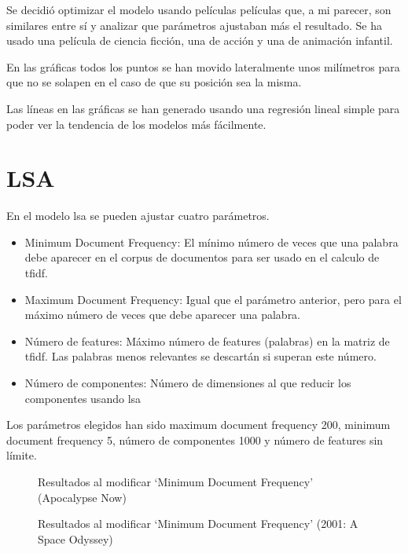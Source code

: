 \documentclass[withindex, glossary]{cam-thesis}
\begin{document}
Se decidió optimizar el modelo usando películas películas que, a mi parecer, son similares entre sí y analizar que parámetros ajustaban más el resultado. Se ha usado una película de ciencia ficción, una de acción y una de animación infantil.

En las gráficas todos los puntos se han movido lateralmente unos milímetros para que no se solapen en el caso de que su posición sea la misma.

Las líneas en las gráficas se han generado usando una regresión lineal simple para poder ver la tendencia de los modelos más fácilmente.

\section{LSA}
En el modelo \acrshort{lsa} se pueden ajustar cuatro parámetros.

\begin{itemize}
    \item Minimum Document Frequency: El mínimo número de veces que una palabra debe aparecer en el corpus de documentos para ser usado en el calculo de \acrshort{tfidf}.
    \item Maximum Document Frequency: Igual que el parámetro anterior, pero para el máximo número de veces que debe aparecer una palabra.
    \item Número de features: Máximo número de features (palabras) en la matriz de \acrshort{tfidf}. Las palabras menos relevantes se descartán si superan este número.
    \item Número de componentes: Número de dimensiones al que reducir los componentes usando \acrshort{lsa}
\end{itemize}

Los parámetros elegidos han sido maximum document frequency 200, minimum document frequency 5, número de componentes 1000 y número de features sin límite.

\newlength\figureheight
\newlength\figurewidth
\setlength{}
\setlength\figurewidth{\linewidth}
\begin{figure}[!htbp]
    \centering
    
    \caption{Resultados al modificar `Minimum Document Frequency' (Apocalypse Now)}
\end{figure}

\begin{figure}[!htbp]
    \centering
    
    \caption{Resultados al modificar `Minimum Document Frequency' (2001: A Space Odyssey)}
\end{figure}
\end{document}
